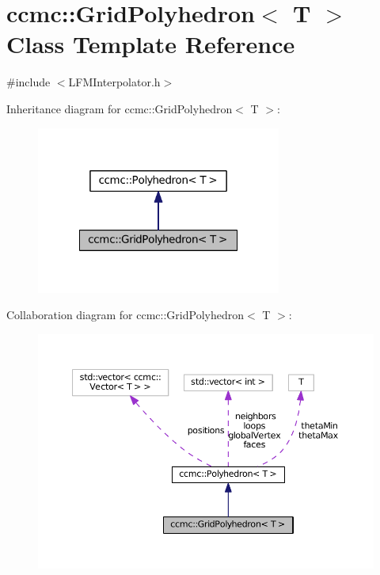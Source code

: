 \hypertarget{classccmc_1_1_grid_polyhedron}{\section{ccmc\-:\-:Grid\-Polyhedron$<$ T $>$ Class Template Reference}
\label{classccmc_1_1_grid_polyhedron}
}


{\ttfamily \#include $<$L\-F\-M\-Interpolator.\-h$>$}



Inheritance diagram for ccmc\-:\-:Grid\-Polyhedron$<$ T $>$\-:
\nopagebreak
\begin{figure}[H]
\begin{center}
\leavevmode
\includegraphics[width=228pt]{classccmc_1_1_grid_polyhedron__inherit__graph}
\end{center}
\end{figure}


Collaboration diagram for ccmc\-:\-:Grid\-Polyhedron$<$ T $>$\-:
\nopagebreak
\begin{figure}[H]
\begin{center}
\leavevmode
\includegraphics[width=350pt]{classccmc_1_1_grid_polyhedron__coll__graph}
\end{center}
\end{figure}
